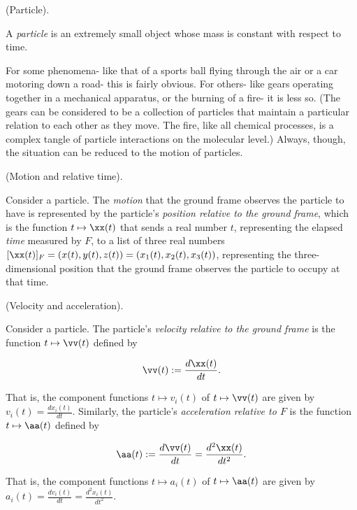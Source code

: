 \documentclass{article}
\begin{document}
\begin{defn}
	(Particle).
	
	A \textit{particle} is an extremely small object whose mass is constant with respect to time.
\end{defn}

For some phenomena- like that of a sports ball flying through the air or a car motoring down a road- this is fairly obvious. For others- like gears operating together in a mechanical apparatus, or the burning of a fire- it is less so. (The gears can be considered to be a collection of particles that maintain a particular relation to each other as they move. The fire, like all chemical processes, is a complex tangle of particle interactions on the molecular level.) Always, though, the situation can be reduced to the motion of particles. 

\begin{defn}
	(Motion and relative time).
	
	Consider a particle. The \textit{motion} that the ground frame observes the particle to have is represented by the particle's \textit{position relative to the ground frame}, which is the function $t \mapsto \xx(t)$ that sends a real number $t$, representing the elapsed \textit{time} measured by $F$, to a list of three real numbers $[\xx(t)]_F = (x(t), y(t), z(t)) = (x_1(t), x_2(t), x_3(t))$, representing the three-dimensional position that the ground frame observes the particle to occupy at that time.
\end{defn}

\begin{defn}
	(Velocity and acceleration).
	
	Consider a particle. The particle's \textit{velocity relative to the ground frame} is the function $t \mapsto \vv(t)$ defined by
	
	\begin{align*}
		\vv(t) := \frac{d\xx(t)}{dt}.
	\end{align*}
	
	That is, the component functions $t \mapsto v_i(t)$ of $t \mapsto \vv(t)$ are given by $v_i(t) = \frac{dx_i(t)}{dt}$. Similarly, the particle's \textit{acceleration relative to $F$} is the function $t \mapsto \aa(t)$ defined by
	
	\begin{align*}
		\aa(t) := \frac{d\vv(t)}{dt} = \frac{d^2\xx(t)}{dt^2}.
	\end{align*}
	
	That is, the component functions $t \mapsto a_i(t)$ of $t \mapsto \aa(t)$ are given by $a_i(t) = \frac{dv_i(t)}{dt} = \frac{d^2 x_i(t)}{dt^2}$.
\end{defn}
\end{document}
